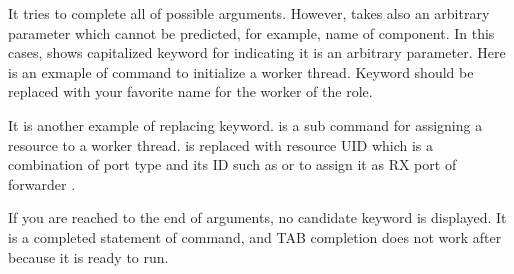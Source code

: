\documentclass[a4paper,11pt,openany,oneside,english]{sphinxmanual}
\begin{document}
It tries to complete all of possible arguments. However,  takes
also an arbitrary parameter which cannot be predicted, for example, name of
component. In this cases,  shows capitalized keyword for
indicating it is an arbitrary parameter. Here is an exmaple of 
command to initialize a worker thread. Keyword  should be replaced with
your favorite name for the worker of the role.

\begin{sphinxVerbatim}[commandchars=\\\{\},formatcom=\footnotesize]
\end{sphinxVerbatim}

It is another example of replacing keyword.  is a sub command for
assigning a resource to a worker thread.  is replaced with
resource UID which is a combination of port type and its ID such as
 or  to assign it as RX port of forwarder .

\begin{sphinxVerbatim}[commandchars=\\\{\},formatcom=\footnotesize]
\end{sphinxVerbatim}

If you are reached to the end of arguments, no candidate keyword is displayed.
It is a completed statement of  command, and TAB
completion does not work after  because it is ready to run.

\begin{sphinxVerbatim}[commandchars=\\\{\},formatcom=\footnotesize]
\end{sphinxVerbatim}
\end{document}
